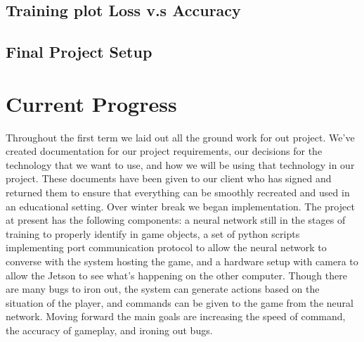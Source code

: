 \documentclass[onecolumn, draftclsnofoot,10pt, compsoc]{IEEEtran}
\begin{document}
\subsection{Training plot Loss v.s Accuracy}
\begin{center}
\end{center}
\subsection{Final Project Setup}
\begin{center}
\end{center}





\section{Current Progress}
Throughout the first term we laid out all the ground work for out project.
We've created documentation for our project requirements, our decisions for the technology that we want to use, and how we will be using that technology in our project.
These documents have been given to our client who has signed and returned them to ensure that everything can be smoothly recreated and used in an educational setting.
\newline\newline
Over winter break we began implementation.
The project at present has the following components: a neural network still in the stages of training to properly identify in game objects, a set of python scripts implementing port communication protocol to allow the neural network to converse with the system hosting the game, and a hardware setup with camera to allow the Jetson to see what's happening on the other computer.
Though there are many bugs to iron out, the system can generate actions based on the situation of the player, and commands can be given to the game from the neural network.
Moving forward the main goals are increasing the speed of command, the accuracy of gameplay, and ironing out bugs.
\end{document}
